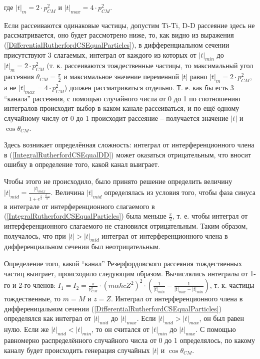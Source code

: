 \documentclass[a4paper,12pt]{article}
\begin{document}
\begin{large}
	где $|t|_{m}=2\cdot p^2_{CM}$ и $|t|_{max}=4\cdot p^2_{CM}$.
	
	Если рассеиваются одинаковые частицы, допустим Ti-Ti, D-D рассеяние здесь не рассматривается, оно будет рассмотрено ниже, то, как видно из выражения (\ref{DifferentialRutherfordCSEqualParticles}), в дифференциальном сечении присутствуют 3 слагаемых, интеграл от каждого из которых от $|t|_{min}$ до $|t|_m=2\cdot p^2_{CM}$ (т. к. рассеиваются тождественные частицы, то максимальный угол рассеяния $\theta_{CM}=\frac{\pi}{2}$ и максимальное значение переменной $|t|$ равно $|t|_m=2\cdot p^2_{CM}$, а не $|t|_{max}=4\cdot p^2_{CM}$) должен рассматриваться отдельно.
	Т. е. как бы есть 3 ``канала'' рассеяния, с помощью случайного числа от 0 до 1 по соотношению интегралов происходит выбор в каком канале рассеиваться, и по ещё одному случайному числу от 0 до 1 происходит рассеяние -- получается значение $|t|$ и $\cos{\theta_{CM}}$.
	
	Здесь возникает определённая сложность: интеграл от интерференционного члена в (\ref{IntegralRutherfordCSEqualDD}) может оказаться отрицательным, что вносит ошибку в определение того, какой канал выиграет.
	
	Чтобы этого не происходило, было принято решение определить величину $|t|_{mid}=\frac{|t|_{max}}{1+e^{\frac{\pi}{2} \cdot \frac{\beta^r_{CM}}{\alpha}}}$.
	Величина $|t|_{mid}$ определялась из условия того, чтобы фаза синуса в интеграле от интерференционного слагаемого в (\ref{IntegralRutherfordCSEqualParticles}) была меньше $\frac{\pi}{2}$, т. е. чтобы интеграл от интерференционного слагаемого не становился отрицательным.
	Таким образом, получалось, что при $|t| > |t|_{mid}$ интеграл от интерференционного члена в дифференциальном сечении был неотрицательным.
	
	Определение того, какой ``канал'' Резерфордовского рассеяния тождественных частиц выиграет, происходило следующим образом.
	Вычислялись интегралы от 1-го и 2-го членов: $I_1=I_2=\frac{\pi}{p^2_{CM}} \cdot \left( m \alpha \hbar c Z^2 \right)^2 \cdot \left( \frac{1}{|t|_{min}} - \frac{1}{|t|_{max}-|t|_{min}} \right)$, т. к. частицы тождественные, то $m=M$ и $z=Z$.
	Интеграл от интерференционного члена в дифференицальном сечении (\ref{DifferentialRutherfordCSEqualParticles}) определялся как интеграл от $|t|_{mid}$ до $|t|_{max}$.
	Если $|t|_{mid} > |t|_{max}$, он был равен нулю.
	Если же $|t|_{mid} < |t|_{min}$, то он считался от $|t|_{min}$ до $|t|_{max}$.
	С помощью равномерно распределённого случайного числа от 0 до 1 определялось, по какому каналу будет происходить генерация случайных $|t|$ и $\cos{\theta_{CM}}$.
	

\end{large}
\end{document}
